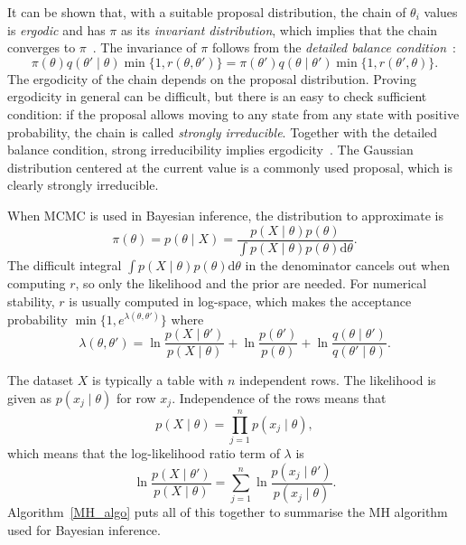 \documentclass[english,twoside,openright]{HYgraduMLDS}
\newcommand{\dx}{\mathrm{d}}
\begin{document}
It can be shown that, with a suitable proposal distribution, the chain of
\(\theta_i\) values is \emph{ergodic} and has \(\pi\) as its \emph{invariant
distribution}, which implies that the chain converges to \(\pi\)~\cite{Has70}.
The invariance of \(\pi\) follows from the \emph{detailed balance condition}~\cite{Robert04}:
\[
  \pi(\theta)q(\theta'\mid \theta)\min\{1, r(\theta, \theta')\}
  = \pi(\theta')q(\theta\mid \theta')\min\{1, r(\theta', \theta)\}.
\]
The ergodicity of the chain depends on the proposal distribution. Proving
ergodicity in general can be difficult, but there is an easy to check
sufficient condition: if the proposal allows moving to any state from any
state with positive probability, the chain is called
\emph{strongly irreducible}. Together with the detailed balance condition,
strong irreducibility implies ergodicity~\cite{Robert04}. The Gaussian
distribution centered
at the current value is a commonly used proposal, which is clearly
strongly irreducible.

When MCMC is used in Bayesian inference, the distribution to approximate is 
\[
    \pi(\theta) = p(\theta \mid X) = \frac{p(X \mid \theta)p(\theta)}
    {\int p(X\mid \theta)p(\theta)\dx\theta}.
\]
The difficult integral \(\int p(X\mid \theta)p(\theta)\dx\theta\) in the denominator
cancels out when computing \(r\), so only the likelihood and the prior are needed. 
For numerical stability, \(r\) is usually computed in 
log-space, which makes the acceptance probability
\(\min\{1, e^{\lambda(\theta, \theta')}\}\) where 
\begin{equation}\label{lambda_equation}
    \lambda(\theta, \theta') = \ln \frac{p(X\mid \theta')}{p(X\mid \theta)}
    + \ln \frac{p(\theta')}{p(\theta)}
    + \ln \frac{q(\theta\mid \theta')}{q(\theta'\mid \theta)}.
\end{equation}

The dataset \(X\) is typically a table with \(n\) independent rows.
The likelihood is given as \(p(x_j\mid \theta)\)
for row \(x_j\). Independence of the rows means that 
\[
    p(X\mid \theta) = \prod_{j=1}^n p(x_j\mid \theta),
\]
which means that the log-likelihood ratio term of \(\lambda\) is
\[
    \ln \frac{p(X\mid \theta')}{p(X\mid \theta)}
    = \sum_{j=1}^n \ln\frac{p(x_j\mid \theta')}{p(x_j\mid \theta)}.
\]
Algorithm~\ref{MH_algo} puts all of this together to summarise the MH 
algorithm used for Bayesian inference.
\end{document}

